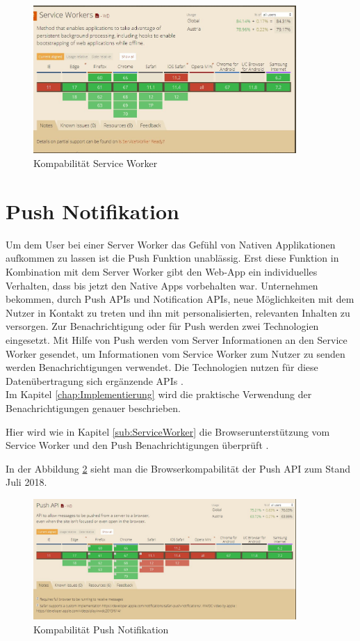 \begin{figure}[h]
	\centering
	\includegraphics[width=10cm]{BilderAllgemein/BrowserSW}\medskip
	\caption{Kompabilität Service Worker \cite{BrowserSupport}}
	\label{fig:BrowserSW}
\end{figure}


\section{Push Notifikation}
Um dem User bei einer Server Worker das Gefühl von Nativen Applikationen aufkommen zu lassen ist die Push Funktion unablässig. Erst diese Funktion in Kombination mit dem Server Worker gibt den \acl{Web-App} ein individuelles Verhalten, dass bis jetzt den Native Apps vorbehalten war.
Unternehmen bekommen, durch Push APIs und Notification APIs, neue Möglichkeiten mit dem Nutzer in Kontakt zu treten und ihn mit personalisierten, relevanten Inhalten zu versorgen.
Zur Benachrichtigung oder für Push werden zwei Technologien eingesetzt. Mit Hilfe von Push werden vom Server Informationen an den Service Worker gesendet, um Informationen vom Service Worker zum Nutzer zu senden werden Benachrichtigungen verwendet. Die Technologien nutzen für diese Datenübertragung sich ergänzende APIs \cite{PushNotifikation}. \\
Im Kapitel \ref{chap:Implementierung} wird die praktische Verwendung der Benachrichtigungen genauer beschrieben.  
 

Hier wird wie in Kapitel \ref{sub:ServiceWorker} die Browserunterstützung vom Service Worker und den Push Benachrichtigungen überprüft \cite{PushNotifikation}.


In der Abbildung \ref{fig:BrowserPushAPI} sieht man die Browserkompabilität der Push API zum Stand Juli 2018.
\begin{figure}[H]
	\centering
	\includegraphics[width=10cm]{BilderAllgemein/BrowserPushAPI}\medskip
	\caption{Kompabilität Push Notifikation \cite{BrowserSupport}}
	\label{fig:BrowserPushAPI}
\end{figure}




